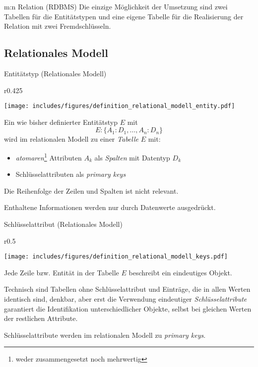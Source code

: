 \begin{bonus}{m:n Relation (RDBMS)}
    Die einzige Möglichkeit der Umsetzung sind zwei Tabellen für die Entitätstypen und eine eigene Tabelle für die Realisierung der Relation mit zwei Fremdschlüsseln.
\end{bonus}

\subsection{Relationales Modell}

\begin{defi}{Entitätstyp (Relationales Modell)}
    \begin{wrapfigure}{r}{0.425\textwidth}
        \begin{center}
            \texttt{[image: includes/figures/definition\_relational\_modell\_entity.pdf]}
        \end{center}
    \end{wrapfigure}
    Ein wie bisher definierter Entitätstyp $E$ mit
    \[
        E: \{ A_1:D_1, \ldots, A_n:D_n \}
    \]
    wird im relationalen Modell zu einer \emph{Tabelle} $E$ mit:
    \begin{itemize}
        \item \emph{atomaren}\footnote{weder zusammengesetzt noch mehrwertig} Attributen $A_k$ als \emph{Spalten} mit Datentyp $D_k$
        \item Schlüsselattributen als \emph{primary keys}
    \end{itemize}

    Die Reihenfolge der Zeilen und Spalten ist nicht relevant.

    Enthaltene Informationen werden nur durch Datenwerte ausgedrückt.
\end{defi}

\begin{defi}{Schlüsselattribut (Relationales Modell)}
    \begin{wrapfigure}{r}{0.5\textwidth}
        \begin{center}
            \texttt{[image: includes/figures/definition\_relational\_modell\_keys.pdf]}
        \end{center}
    \end{wrapfigure}
    Jede Zeile bzw. Entität in der Tabelle $E$ beschreibt ein eindeutiges Objekt.

    Technisch sind Tabellen ohne Schlüsselattribut und Einträge, die in allen Werten identisch sind, denkbar, aber erst die Verwendung eindeutiger \emph{Schlüsselattribute} garantiert die Identifikation unterschiedlicher Objekte, selbst bei gleichen Werten der restlichen Attribute.

    Schlüsselattribute werden im relationalen Modell zu \emph{primary keys}.
\end{defi}

